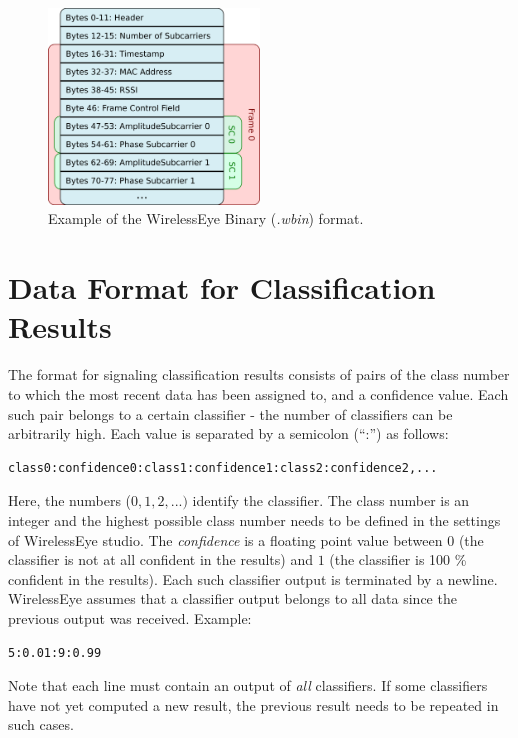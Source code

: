\documentclass{article}
\begin{document}
\begin{figure}
\centering
\vspace*{-.5cm}
\includegraphics[width=0.5\textwidth]{images/wbinformat.png}
\caption{Example of the WirelessEye Binary (\textit{.wbin}) format.}
\label{fig:wbinformat}
\end{figure}

\section{Data Format for Classification Results}
The format for signaling classification results consists of pairs of the class number to which the most recent data has been assigned to, and a confidence value. Each such pair belongs to a certain classifier - the number of classifiers can be arbitrarily high. Each value is separated by a semicolon (``:'') as follows:
\begin{verbatim}
class0:confidence0:class1:confidence1:class2:confidence2,...
\end{verbatim}
Here, the numbers ($0,1,2,...)$ identify the classifier. 
The class number is an integer and the highest possible class number needs to be defined in the settings of WirelessEye studio. The \textit{confidence} is a floating point value between $0$ (the classifier is not at all confident in the results) and $1$ (the classifier is 100 \% confident in the results). Each such classifier output is terminated by a newline. WirelessEye assumes that a classifier output belongs to all data since the previous output was received.
Example:
\begin{verbatim}
5:0.01:9:0.99
\end{verbatim}
Note that each line must contain an output of \emph{all} classifiers. If some classifiers have not yet computed a new result, the previous result needs to be repeated in such cases. 
\end{document}
